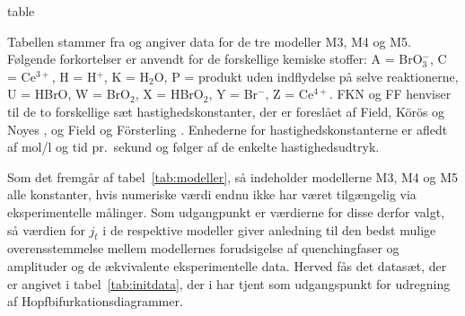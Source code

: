 \begin{landfloat}{table}{\rotateright}
\renewcommand{\capfont}{\bf}
\begin{center}
 
\end{center}
\caption{\protect\capsize
  Tabellen stammer fra \protect\cite{HopfQuench} og angiver
  data for de tre model\-ler M3, M4 og M5. F{\o}lgende
  forkortelser er anvendt for de forskellige kemiske
  stoffer: A = BrO$_3^-$, C = Ce$^{3+}$, H = H$^+$, K =
  H$_2$O, P = produkt uden indflydelse p{\aa} selve
  reaktionerne, U = HBrO, W = BrO$_2$, X = HBrO$_2$, Y =
  Br$^-$, Z = Ce$^{4+}$. FKN og FF henviser til de to
  forskellige s{\ae}t hastighedskonstanter, der er
  foresl{\aa}et af Field, K\"{o}r\"{o}s og Noyes
  \protect\cite{FKNorig}, og Field og F\"{o}rsterling
  \protect\cite{ffrate}. Enhederne for
  hastighedskonstanterne er afledt af mol/l og tid
  \mbox{pr.\ sekund} og f{\o}lger af de enkelte hastighedsudtryk.}
  \label{tab:modeller}
  \renewcommand{\capfont}{\rm}
\end{landfloat}

\vspace{4.0mm}
Som det fremg{\aa}r af tabel~\ref{tab:modeller}, s{\aa}
indeholder model\-lerne M3, M4 og M5 alle konstanter, hvis
numeriske v{\ae}rdi endnu ikke har v{\ae}ret
tilg{\ae}ngelig via eksperimentelle m{\aa}linger. Som
udgangpunkt er v{\ae}rdierne for disse derfor valgt, s{\aa}
v{\ae}rdien for $j_t$ i de respektive model\-ler giver
anledning til den bedst mulige overensstemmelse mellem
model\-lernes forudsigelse af quenching\-faser og amplituder og
de {\ae}kvivalente eksperimentelle data. Herved f{\aa}s det
datas{\ae}t, der er angivet i tabel~\ref{tab:initdata}, der
i \cite{HopfQuench} har tjent som udgangspunkt for
udregning af Hopfbifurkationsdiagrammer.

